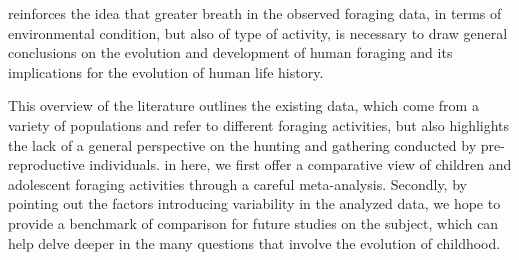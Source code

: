 \cite{koster_life_2020} reinforces the idea that greater breath in the observed foraging data, in terms of environmental condition, but also of type of activity, is necessary to draw general conclusions on the evolution and development of human foraging and its implications for the evolution of human life history. 

This overview of the literature outlines the existing data, which come from a variety of populations and refer to different foraging activities, but also highlights the lack of a general perspective on the hunting and gathering conducted by pre-reproductive individuals. in here, we first offer a comparative view of children and adolescent foraging activities through a careful meta-analysis. Secondly, by pointing out the factors introducing variability in the analyzed data, we hope to provide a benchmark of comparison for future studies on the subject, which can help delve deeper in the many questions that involve the evolution of childhood. 